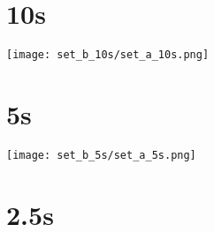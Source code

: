 \documentclass{article}
\begin{document}
\belowcaptionskip=-10pt


\section{10s}
    \noindent\begin{minipage}{.45\textwidth}
    
    \end{minipage}\hfill
    \begin{minipage}{.45\textwidth}
    
    \end{minipage}
    
    \begin{center}
        \texttt{[image: set\_b\_10s/set\_a\_10s.png]}
    \end{center}
\clearpage

\section{5s}
    \noindent\begin{minipage}{.45\textwidth}
    
    \end{minipage}\hfill
    \begin{minipage}{.45\textwidth}
    
    \end{minipage}
    
    \begin{center}
    \texttt{[image: set\_b\_5s/set\_a\_5s.png]}
    \end{center}
\clearpage

\section{2.5s}
    \noindent\begin{minipage}{.45\textwidth}
    
    \end{minipage}\hfill
    \begin{minipage}{.45\textwidth}
    
    \end{minipage}
    
\end{document}
